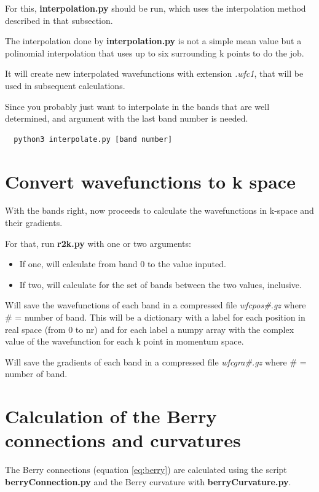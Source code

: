 \documentclass[a4paper,12pt]{report}
\begin{document}
 For this, \textbf{interpolation.py} should be run, which uses the interpolation method described in that subsection.

 The interpolation done by \textbf{interpolation.py} is not a simple mean value but a polinomial interpolation
 that uses up to six surrounding k points to do the job.

 It will create new interpolated wavefunctions with extension \emph{.wfc1}, that will be used in subsequent calculations.

 Since you probably just want to interpolate in the bands that are well determined, and argument with the last band number
 is needed.
 \begin{verbatim}
  python3 interpolate.py [band number]
 \end{verbatim}


\section{Convert wavefunctions to k space}

With the bands right, now proceeds to calculate the wavefunctions in k-space and their gradients.

For that, run \textbf{r2k.py} with one or two arguments:
\begin{itemize}
 \item If one, will calculate from band 0 to the value inputed.
 \item If two, will calculate for the set of bands between the two values, inclusive.
\end{itemize}

 Will save the wavefunctions of each band in a compressed file \emph{wfcpos\#.gz} where \# = number of band.
 This will be a dictionary with a label for each position in real space (from 0 to nr) and for each label
 a numpy array with the complex value of the wavefunction for each k point in momentum space.

 Will save the gradients of each band in a compressed file \emph{wfcgra\#.gz} where \# = number of band.

\section{Calculation of the Berry connections and curvatures}

The Berry connections (equation \ref{eq:berry}) are calculated using the script \textbf{berryConnection.py}
and the Berry curvature with \textbf{berryCurvature.py}.
\end{document}
